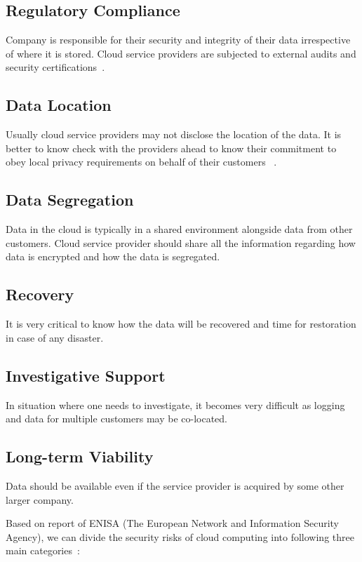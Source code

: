 \subsection{Regulatory Compliance}
Company is responsible for their security and integrity of their data 
irrespective of where it is stored. Cloud service providers are subjected
to external audits and security certifications~\cite{hid-sp18-513-gartner}. 

\subsection{Data Location} 
Usually cloud service providers may not disclose the location of the data.
It is better to know check with the providers ahead to know their commitment to
obey local privacy requirements on behalf of their customers
~\cite{hid-sp18-513-gartner}.

\subsection{Data Segregation} 
Data in the cloud is typically in a shared environment alongside data from 
other customers. Cloud service provider should share all the information
regarding how data is encrypted and how the data is segregated.

\subsection{Recovery} 
It is very critical to know how the data will be recovered and time for 
restoration in case of any disaster. 

\subsection{Investigative Support} 
In situation where one needs to investigate, it becomes very difficult 
as logging and data for multiple customers may be co-located.

\subsection{Long-term Viability} 
Data should be available even if the service provider is acquired 
by some other larger company.


Based on report of ENISA (The European Network and Information 
Security Agency), we can divide the security risks of cloud computing
into following three main categories~\cite{hid-sp18-513-enisa}:

